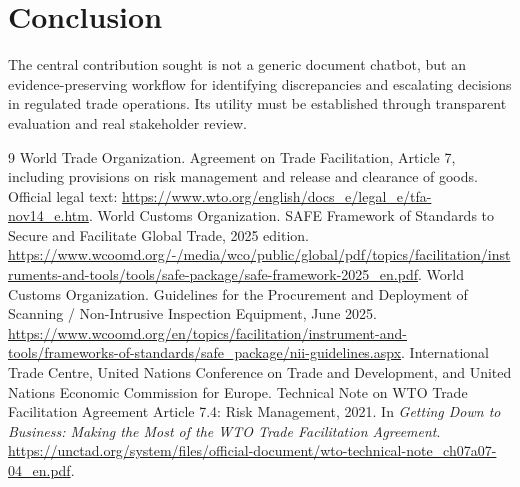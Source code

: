 \documentclass[11pt]{article}
\begin{document}
\section{Conclusion}
The central contribution sought is not a generic document chatbot, but an evidence-preserving workflow for identifying discrepancies and escalating decisions in regulated trade operations. Its utility must be established through transparent evaluation and real stakeholder review.
\begin{thebibliography}{9}
 World Trade Organization. Agreement on Trade Facilitation, Article 7, including provisions on risk management and release and clearance of goods. Official legal text: \url{https://www.wto.org/english/docs_e/legal_e/tfa-nov14_e.htm}.
 World Customs Organization. SAFE Framework of Standards to Secure and Facilitate Global Trade, 2025 edition. \url{https://www.wcoomd.org/-/media/wco/public/global/pdf/topics/facilitation/instruments-and-tools/tools/safe-package/safe-framework-2025_en.pdf}.
 World Customs Organization. Guidelines for the Procurement and Deployment of Scanning / Non-Intrusive Inspection Equipment, June 2025. \url{https://www.wcoomd.org/en/topics/facilitation/instrument-and-tools/frameworks-of-standards/safe_package/nii-guidelines.aspx}.
 International Trade Centre, United Nations Conference on Trade and Development, and United Nations Economic Commission for Europe. Technical Note on WTO Trade Facilitation Agreement Article 7.4: Risk Management, 2021. In \textit{Getting Down to Business: Making the Most of the WTO Trade Facilitation Agreement}. \url{https://unctad.org/system/files/official-document/wto-technical-note_ch07a07-04_en.pdf}.
\end{thebibliography}
\end{document}
